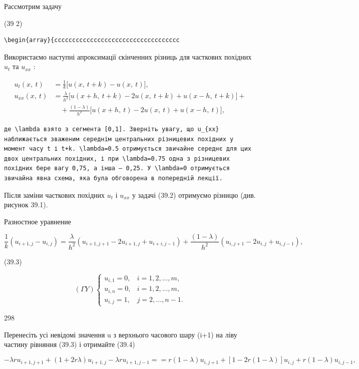 \documentclass[
  ukrainian,
]{article}
\begin{document}
Рассмотрим задачу

(39 2)

\begin{verbatim}
\begin{array}{ccccccccccccccccccccccccccccccccccc
\end{verbatim}

Використаємо наступні апроксимації скінченних різниць для часткових
похідних \(u_t\) та \(u_{xx}\) :

\[
\begin{split} u_t(x,\ t) &= \frac{1}{k} \big[ u(x,\ t+k) - u(x,\ t) \big], \\ u_{xx}(x,\ t) &= \frac{\lambda}{h^2} \big[ u(x+h,\ t+k) - 2u(x,\ t+k) + u(x-h,\ t+k) \big] + \\ &\quad + \frac{(1-\lambda)}{h^2} \big[ u(x+h,\ t) - 2u(x,\ t) + u(x-h,\ t) \big], \end{split}
\]

\begin{verbatim}
де \lambda взято з сегмента [0,1]. Зверніть увагу, що u_{xx} наближається зваженим середнім центральних різницевих похідних у момент часу t і t+k. \lambda=0.5 отримується звичайне середнє для цих двох центральних похідних, і при \lambda=0.75 одна з різницевих похідних бере вагу 0,75, а інша — 0,25. У \lambda=0 отримується звичайна явна схема, яка була обговорена в попередній лекції.
\end{verbatim}

Після заміни часткових похідних \(u_t\) і \(u_{xx}\) у задачі (39.2)
отримуємо різницю (див. рисунок 39.1).

Разностное уравнение

\[
\frac{1}{k} (u_{i+1, j} - u_{i, j}) = \frac{\lambda}{h^2} (u_{i+1, j+1} - 2u_{i+1, j} + u_{i+i, j-1}) + \frac{(1-\lambda)}{h^2} (u_{i, j+1} - 2u_{i, j} + u_{i, j-1}),
\]

(39.3)

\[
(\Gamma Y) \begin{cases} u_{i, 1} = 0, & i = 1, 2, ..., m, \\ u_{i, n} = 0, & i = 1, 2, ..., m, \\ u_{i, j} = 1, & j = 2, ..., n-1. \end{cases}
\]

298

Перенесіть усі невідомі значення u з верхнього часового шару (i+1) на
ліву частину рівняння (39.3) і отримайте (39.4)

\[
-\lambda r u_{i+1, j+1} + (1+2r\lambda) u_{i+1, j} - \lambda r u_{i+1, j-1} = = r(1-\lambda) u_{i, j+1} + [1-2r(1-\lambda)] u_{i, j} + r(1-\lambda) u_{i, j-1},
\]
\end{document}
